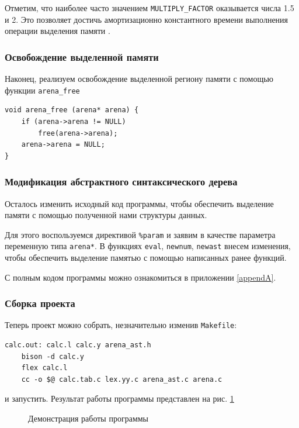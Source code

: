 \documentclass[coursework]{SCWorks}
\begin{document}
Отметим, что наиболее часто значением \texttt{MULTIPLY\_FACTOR} оказывается числа 1.5 и 2. Это позволяет достичь амортизационно константного времени выполнения операции выделения памяти \cite{FB_doc}.

\subsubsection{Освобождение выделенной памяти}

Наконец, реализуем освобождение выделенной региону памяти с помощью функции \texttt{arena\_free}

\begin{verbatim}
void arena_free (arena* arena) {
    if (arena->arena != NULL)
        free(arena->arena);
    arena->arena = NULL;
}
\end{verbatim}

\subsubsection{Модификация абстрактного синтаксического дерева}

Осталось изменить исходный код программы, чтобы обеспечить выделение памяти с помощью полученной нами структуры данных.

Для этого воспользуемся директивой \texttt{\%param} и заявим в качестве параметра переменную типа \texttt{arena*}. В функциях \texttt{eval}, \texttt{newnum}, \texttt{newast} внесем изменения, чтобы обеспечить выделение памятью с помощью написанных ранее функций. 

С полным кодом программы можно ознакомиться в приложении \ref{appendA}.

\subsubsection{Сборка проекта}

Теперь проект можно собрать, незначительно изменив \texttt{Makefile}:
\begin{verbatim}
calc.out: calc.l calc.y arena_ast.h
    bison -d calc.y
    flex calc.l
    cc -o $@ calc.tab.c lex.yy.c arena_ast.c arena.c
\end{verbatim}
и запустить. Результат работы программы представлен на рис. \ref{pic6}

\begin{figure}[H]
	\caption{Демонстрация работы программы}
	\label{pic6}
\end{figure}
\end{document}
